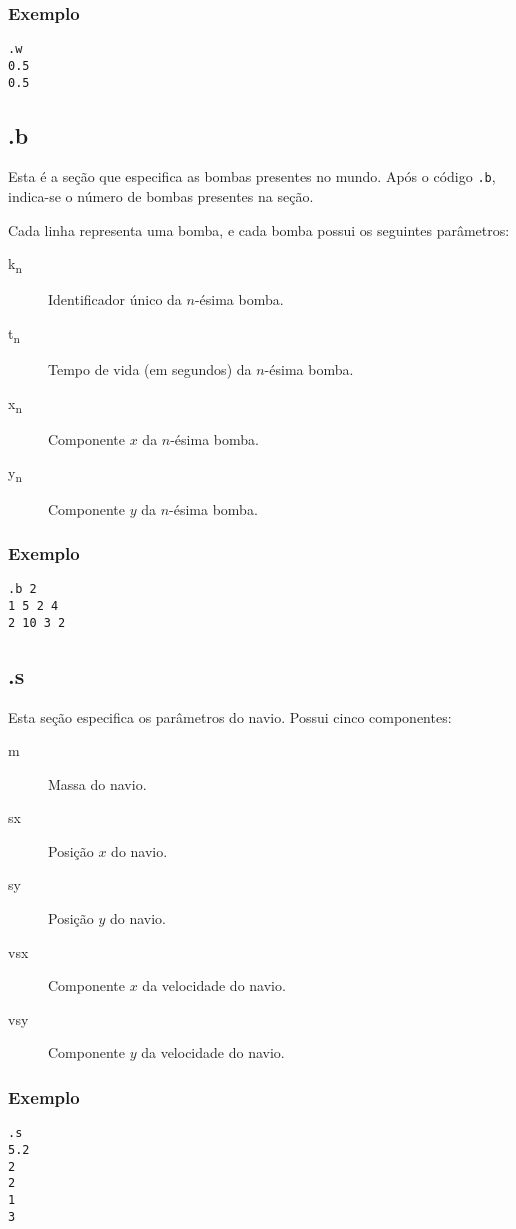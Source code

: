 \documentclass[]{paper}
\begin{document}
\subsubsection{Exemplo}
\texttt{.w\\
0.5\\
0.5}

\subsection{.b}
Esta é a seção que especifica as bombas presentes no mundo. Após o código \texttt{.b}, indica-se o número de bombas presentes na seção.

Cada linha representa uma bomba, e cada bomba possui os seguintes parâmetros:
\begin{description}
\item[k\textsubscript{n}] Identificador único da $n$-ésima bomba.
\item[t\textsubscript{n}] Tempo de vida (em segundos) da $n$-ésima bomba.
\item[x\textsubscript{n}] Componente $x$ da $n$-ésima bomba.
\item[y\textsubscript{n}] Componente $y$ da $n$-ésima bomba.
\end{description}
\subsubsection{Exemplo}
\texttt{.b 2\\
1 5 2 4\\
2 10 3 2}

\subsection{.s}
Esta seção especifica os parâmetros do navio. Possui cinco componentes:
\begin{description}
\item[m] Massa do navio.
\item[sx] Posição $x$ do navio.
\item[sy] Posição $y$ do navio.
\item[vsx] Componente $x$ da velocidade do navio.
\item[vsy] Componente $y$ da velocidade do navio.
\end{description}

\subsubsection{Exemplo}
\texttt{.s\\
5.2\\
2\\
2\\
1\\
3}
\end{document}
